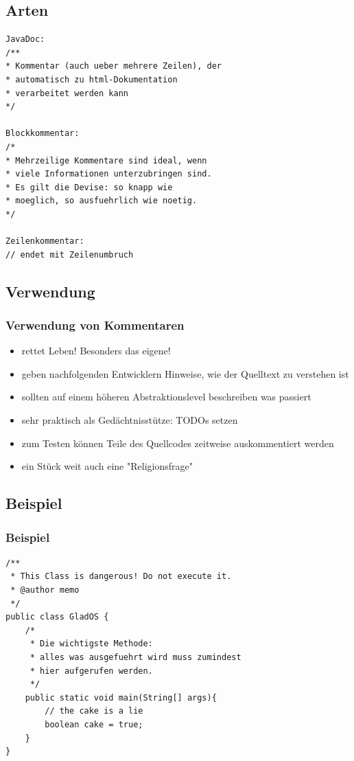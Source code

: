 \documentclass[final]{beamer}
\begin{document}
\subsection{Arten}
\begin{frame}[containsverbatim]
	\begin{lstlisting}
JavaDoc:
/**
* Kommentar (auch ueber mehrere Zeilen), der
* automatisch zu html-Dokumentation
* verarbeitet werden kann
*/

Blockkommentar:
/*
* Mehrzeilige Kommentare sind ideal, wenn
* viele Informationen unterzubringen sind.
* Es gilt die Devise: so knapp wie
* moeglich, so ausfuehrlich wie noetig.
*/

Zeilenkommentar:
// endet mit Zeilenumbruch
	\end{lstlisting}
\end{frame}

\subsection{Verwendung}
\begin{frame}
	\frametitle{Verwendung von Kommentaren}
	\begin{itemize}
		\item{rettet Leben! Besonders das eigene!}
		\item{geben nachfolgenden Entwicklern Hinweise, wie der Quelltext zu verstehen ist}
		\item{sollten auf einem höheren Abstraktionslevel beschreiben was passiert}
		\item{sehr praktisch als Gedächtnisstütze: TODOs setzen}
		\item{zum Testen können Teile des Quellcodes zeitweise auskommentiert werden}
		\pause
		\item{ein Stück weit auch eine "Religionsfrage"}
	\end{itemize}
\end{frame}

\subsection{Beispiel}
\begin{frame}[containsverbatim]
\frametitle{Beispiel}
	\begin{lstlisting}
/**
 * This Class is dangerous! Do not execute it.
 * @author memo
 */
public class GladOS {
	/*
	 * Die wichtigste Methode:
	 * alles was ausgefuehrt wird muss zumindest
	 * hier aufgerufen werden.
	 */
	public static void main(String[] args){
		// the cake is a lie
		boolean cake = true;
	}
}
	\end{lstlisting}
%
\end{frame}
\end{document}
